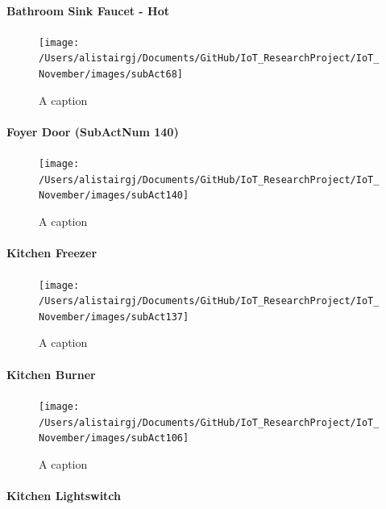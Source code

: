 \documentclass[11pt,]{article}
\let\oldparagraph\paragraph
\renewcommand{\paragraph}[1]{\oldparagraph{#1}\mbox{}}
\begin{document}
\hypertarget{bathroom-sink-faucet---hot}{%
\paragraph{Bathroom Sink Faucet -
Hot}\label{bathroom-sink-faucet---hot}}

\begin{figure}[H]
\texttt{[image: /Users/alistairgj/Documents/GitHub/IoT\_ResearchProject/IoT\_November/images/subAct68]} \caption{A caption}\label{fig:subAct68}
\end{figure}

\hypertarget{foyer-door-subactnum-140}{%
\paragraph{Foyer Door (SubActNum 140)}\label{foyer-door-subactnum-140}}

\begin{figure}[H]
\texttt{[image: /Users/alistairgj/Documents/GitHub/IoT\_ResearchProject/IoT\_November/images/subAct140]} \caption{A caption}\label{fig:subAct140}
\end{figure}

\hypertarget{kitchen-freezer}{%
\paragraph{Kitchen Freezer}\label{kitchen-freezer}}

\begin{figure}[H]
\texttt{[image: /Users/alistairgj/Documents/GitHub/IoT\_ResearchProject/IoT\_November/images/subAct137]} \caption{A caption}\label{fig:subAct137}
\end{figure}

\hypertarget{kitchen-burner}{%
\paragraph{Kitchen Burner}\label{kitchen-burner}}

\begin{figure}[H]
\texttt{[image: /Users/alistairgj/Documents/GitHub/IoT\_ResearchProject/IoT\_November/images/subAct106]} \caption{A caption}\label{fig:subAct106}
\end{figure}

\hypertarget{kitchen-lightswitch}{%
\paragraph{Kitchen Lightswitch}\label{kitchen-lightswitch}}
\end{document}
